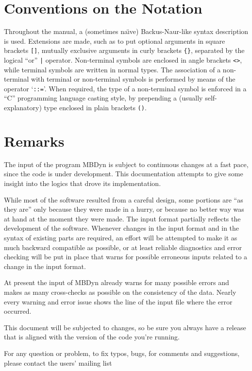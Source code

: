 \documentclass[10pt,dvips]{report}
\newcommand{\kw}[1]{\texttt{#1}}
\begin{document}
\section*{Conventions on the Notation}
Throughout the manual, a (sometimes na\"{\i}ve) 
Backus-Naur-like syntax description is used. 
Extensions are made, such as to put optional arguments in square brackets
\kw{[]}, mutually exclusive arguments in curly brackets \kw{\{\}},
separated by the logical ``or'' \kw{|} operator.
Non-terminal symbols are enclosed in angle brackets \kw{<>}, while
terminal symbols are written in normal types.
The association of a non-terminal with terminal or non-terminal
symbols is performed by means of the operator `\kw{::=}'. 
When required, the type of a non-terminal symbol is enforced in a ``C''
programming language casting style, by prepending a (usually
self-explanatory) type enclosed in plain brackets \kw{()}.


\section*{Remarks}
The input of the program MBDyn is subject to continuous changes
at a fast pace, since the code is under development.
This documentation attempts to give some insight into the logics 
that drove its implementation.

While most of the software resulted from a careful design, 
some portions are ``as they are'' only because they were made in a hurry, 
or because no better way was at hand at the moment they were made.
The input format partially reflects the development of the software.
Whenever changes in the input format and in the syntax 
of existing parts are required, an effort will be attempted to make 
it as much backward compatible as possible, or at least reliable 
diagnostics and error checking will be put in place that warns 
for possible erroneous inputs related to a change in the input format. 

At present the input of MBDyn already warns for many possible errors 
and makes as many cross-checks as possible on the consistency of the data. 
Nearly every warning and error issue shows the line of the input file 
where the error occurred. 

This document will be subjected to changes, so be sure you always have 
a release that is aligned with the version of the code you're running.

For any question or problem, to fix typos, bugs, for comments and
suggestions, please contact the users' mailing list
\end{document}
